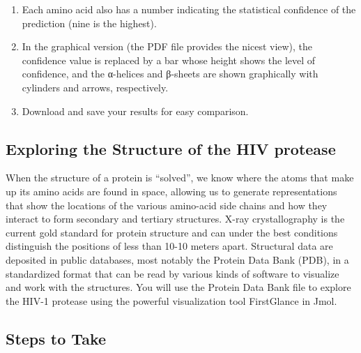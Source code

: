 \begin{enumerate}
 \item Each amino acid also has a number indicating the statistical confidence of the prediction (nine is the highest).

 \item In the graphical version (the PDF file provides the nicest view), the confidence value is replaced by a bar whose height shows the level of confidence, and the α-helices and β-sheets are shown graphically with cylinders and arrows, respectively.  

 \item Download and save your results for easy comparison.

\end{enumerate}



\subsection*{Exploring the Structure of the HIV protease}

When the structure of a protein is “solved”, we know where the atoms that make up its amino acids are found in space, allowing us to generate representations that show the locations of the various amino-acid side chains and how they interact to form secondary and tertiary structures.  X-ray crystallography is the current gold standard for protein structure and can under the best conditions distinguish the positions of less than 10-10 meters apart.  Structural data are deposited in public databases, most notably the Protein Data Bank (PDB), in a standardized format that can be read by various kinds of software to visualize and work with the structures.  You will use the Protein Data Bank file to explore the HIV-1 protease using the powerful visualization tool FirstGlance in Jmol. 

\subsection*{Steps to Take}


